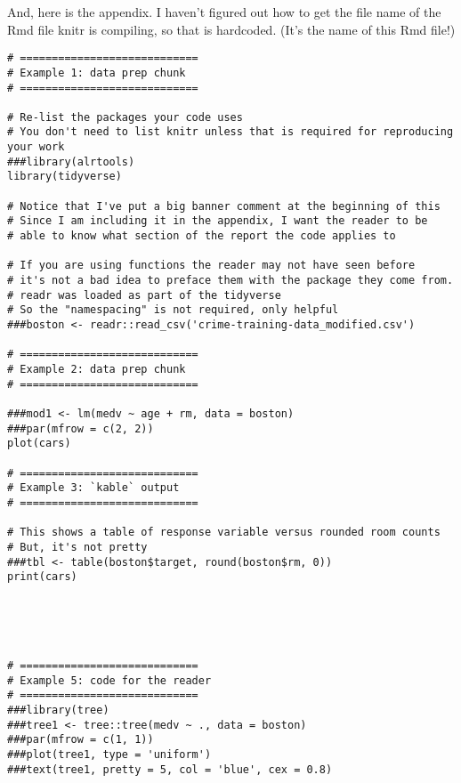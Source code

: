 \documentclass[
]{article}
\begin{document}
And, here is the appendix. I haven't figured out how to get the file
name of the Rmd file knitr is compiling, so that is hardcoded. (It's the
name of this Rmd file!)

\begin{verbatim}
# ============================
# Example 1: data prep chunk
# ============================

# Re-list the packages your code uses
# You don't need to list knitr unless that is required for reproducing your work
###library(alrtools)
library(tidyverse)

# Notice that I've put a big banner comment at the beginning of this
# Since I am including it in the appendix, I want the reader to be
# able to know what section of the report the code applies to

# If you are using functions the reader may not have seen before
# it's not a bad idea to preface them with the package they come from.
# readr was loaded as part of the tidyverse
# So the "namespacing" is not required, only helpful
###boston <- readr::read_csv('crime-training-data_modified.csv')

# ============================
# Example 2: data prep chunk
# ============================

###mod1 <- lm(medv ~ age + rm, data = boston)
###par(mfrow = c(2, 2))
plot(cars)

# ============================
# Example 3: `kable` output
# ============================

# This shows a table of response variable versus rounded room counts
# But, it's not pretty
###tbl <- table(boston$target, round(boston$rm, 0))
print(cars)





# ============================
# Example 5: code for the reader
# ============================
###library(tree)
###tree1 <- tree::tree(medv ~ ., data = boston)
###par(mfrow = c(1, 1))
###plot(tree1, type = 'uniform')
###text(tree1, pretty = 5, col = 'blue', cex = 0.8)
\end{verbatim}
\end{document}

